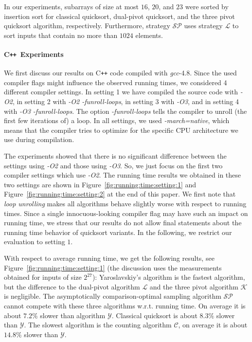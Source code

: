 \documentclass[prodmode,acmtalg]{acmsmall}
\newcommand{\Cpp}{C{}\texttt{++}{}}
\begin{document}
In our experiments, subarrays of size at most $16$, $20$, and $23$ were sorted by
insertion sort for classical quicksort, dual-pivot quicksort, and the three
pivot quicksort algorithm, respectively. Furthermore, strategy $\mathcal{SP}$ uses 
strategy $\mathcal{L}$ to sort inputs that contain no more than  $1024$ elements.

\paragraph{{\Cpp}\, Experiments} We first discuss our results on {\Cpp}
code compiled with \emph{gcc}-4.8. Since the used compiler flags might influence the
observed running times, we considered 4 different compiler
settings.  In setting 1 we have compiled the source code with \emph{-O2}, in
setting 2 with \emph{-O2 -funroll-loops}, in setting 3 with \emph{-O3}, and in
setting 4 with \emph{-O3 -funroll-loops}. The option \emph{-funroll-loops}
tells the compiler to unroll (the first few iterations of) a loop. In all
settings, we used \emph{-march=native}, which means that the compiler tries to
optimize for the specific CPU architecture we use during compilation. 

The experiments showed that there is no significant difference between the settings using \emph{-O2} 
and those using \emph{-O3}. So, we just focus on the first two compiler settings which use \emph{-O2}. 
The running time results we obtained in these two settings are shown in
Figure~\ref{fig:running:time:setting:1} and Figure~\ref{fig:running:time:setting:2} at the end of this paper.
We first note that \emph{loop unrolling} makes all algorithms behave slightly worse with respect to running times. 
Since a single innocuous-looking compiler flag may have such an impact on running time, we stress that our results do not
allow final statements about the running time behavior of quicksort variants. In the following, 
we restrict our evaluation to setting $1$. 

With respect to average running time, we get the following results, 
see Figure~\ref{fig:running:time:setting:1} (the discussion uses the measurements obtained for inputs
of size $2^{27}$): 
Yaroslavskiy's algorithm
is the fastest algorithm, but the difference to the dual-pivot algorithm 
$\mathcal{L}$ and the three pivot algorithm $\mathcal{K}$ is negligible. The
asymptotically comparison-optimal sampling algorithm $\mathcal{SP}$ cannot compete with these three 
algorithms w.r.t. running time. On average it is about $7.2\%$ slower than algorithm $\mathcal{Y}$.
Classical quicksort is about $8.3\%$ slower than $\mathcal{Y}$. The slowest algorithm
is the counting algorithm $\mathcal{C}$, on average it is about $14.8\%$ slower than $\mathcal{Y}$.
\end{document}
